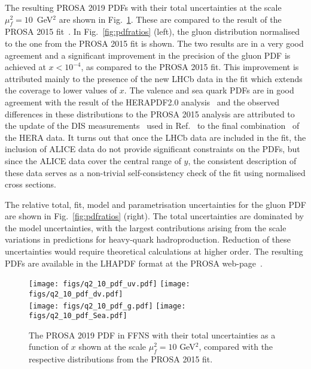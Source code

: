 The resulting PROSA 2019 PDFs with their total uncertainties at the scale $\mu^2_f=10$~GeV$^2$ are shown in Fig.~\ref{fig:pdfs}. These are compared to the result of the PROSA 2015 fit~\cite{Zenaiev:2015rfa}. In Fig.~\ref{fig:pdfratios} (left), the gluon distribution 
normalised to the one from the PROSA 2015 fit is shown. The two results are in a very good agreement and a significant improvement 
in the precision of the gluon PDF is achieved at $x < 10^{-4}$, as compared to the PROSA 2015 fit. 
{\color{blue}This improvement is attributed mainly to the presence of the new LHCb data in the fit which extends the coverage to lower values of $x$.} 
The valence and sea quark PDFs are in good agreement with the result of the HERAPDF2.0 analysis~\cite{Abramowicz:2015mha} and the 
observed differences in these distributions to the PROSA 2015 analysis are attributed to the update of the DIS measurements~\cite{Aaron:2009aa} used in Ref.~\cite{Zenaiev:2015rfa} to the final combination~\cite{Abramowicz:2015mha} of the HERA data.
{\color{blue}It turns out that once the LHCb data are included in the fit, the inclusion of ALICE data do not provide significant constraints on the PDFs, but since the ALICE data cover the central range of $y$, the consistent description of these data serves as a non-trivial self-consistency check of the fit using normalised cross sections.}

The relative total, fit, model and parametrisation uncertainties for the gluon PDF are shown in Fig.~\ref{fig:pdfratios} (right). 
The total uncertainties are dominated by the model uncertainties, with the largest contributions arising from the scale 
variations in predictions for heavy-quark hadroproduction. Reduction of these uncertainties would require theoretical calculations at higher order.  The resulting PDFs are available in the LHAPDF format at the PROSA web-page~\cite{prosaweb}.

\begin{figure}
    \centering
    \texttt{[image: figs/q2\_10\_pdf\_uv.pdf]}
    \texttt{[image: figs/q2\_10\_pdf\_dv.pdf]}\\
    \texttt{[image: figs/q2\_10\_pdf\_g.pdf]}
    \texttt{[image: figs/q2\_10\_pdf\_Sea.pdf]}
    \caption{The PROSA 2019 PDF in FFNS with their total uncertainties as a function of $x$ shown at the scale $\mu^2_f=10$ GeV$^2$, compared with the respective distributions from the PROSA 2015 fit.}
    \label{fig:pdfs}
\end{figure}

